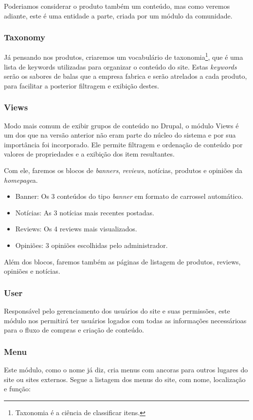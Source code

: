 Poderiamos considerar o produto também um conteúdo, mas como veremos adiante, este é uma entidade a parte, criada por um módulo da comunidade.

\subsubsection{Taxonomy}
Já pensando nos produtos, criaremos um vocabulário de taxonomia\footnote{Taxonomia é a ciência de classificar itens.}, que é uma lista de keywords utilizadas para organizar o conteúdo do site. Estas \textit{keywords} serão os sabores de balas que a empresa fabrica e serão atrelados a cada produto, para facilitar a posterior filtragem e exibição destes.

\subsubsection{Views}
Modo mais comum de exibir grupos de conteúdo no Drupal, o módulo Views é um dos que na versão anterior não eram parte do núcleo do sistema e por sua importância foi incorporado. Ele permite filtragem e ordenação de conteúdo por valores de propriedades e a exibição dos item resultantes. 

Com ele, faremos os blocos de \textit{banners}, \textit{reviews}, notícias, produtos e opiniões da \textit{homepage}a.
\begin{itemize}
  \item Banner: Os 3 conteúdos do tipo \textit{banner} em formato de carrossel automático.
  \item Notícias: As 3 notícias mais recentes postadas.
  \item Reviews: Os 4 reviews mais visualizados.
  \item Opiniões: 3 opiniões escolhidas pelo administrador.
\end{itemize}

Além dos blocos, faremos também as páginas de listagem de produtos, reviews, opiniões e notícias.

\subsubsection{User}
Responsável pelo gerenciamento dos usuários do site e suas permissões, este módulo nos permitirá ter usuários logados com todas as informações necessárioas para o fluxo de compras e criação de conteúdo.

\subsubsection{Menu}
Este módulo, como o nome já diz, cria menus com ancoras para outros lugares do site ou sites externos. Segue a listagem dos menus do site, com nome, localização e função:

